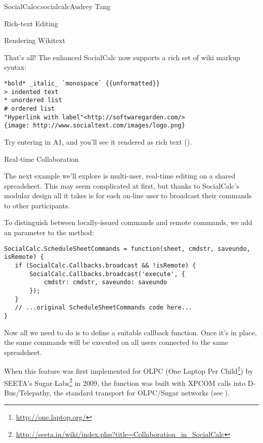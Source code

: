 \begin{aosachapter}{SocialCalc}{s:socialcalc}{Audrey Tang}
\begin{aosasect1}{Rich-text Editing}
\begin{aosasect2}{Rendering Wikitext}

That's all!  The enhanced SocialCalc now supports a rich set of wiki
markup syntax:

\begin{verbatim}
*bold* _italic_ `monospace` {{unformatted}}
> indented text
* unordered list
# ordered list
"Hyperlink with label"<http://softwaregarden.com/>
{image: http://www.socialtext.com/images/logo.png}
\end{verbatim}

\noindent Try entering  in A1, and you'll
see it rendered as rich text ().


\end{aosasect2}

\end{aosasect1}


\begin{aosasect1}{Real-time Collaboration}

The next example we'll explore is multi-user, real-time editing on a
shared spreadsheet.  This may seem complicated at first, but thanks to
SocialCalc's modular design all it takes is for each on-line user to
broadcast their commands to other participants.

To distinguish between locally-issued commands and remote commands, we
add an  parameter to the 
method:

\begin{verbatim}
SocialCalc.ScheduleSheetCommands = function(sheet, cmdstr, saveundo, isRemote) {
   if (SocialCalc.Callbacks.broadcast && !isRemote) {
       SocialCalc.Callbacks.broadcast('execute', {
           cmdstr: cmdstr, saveundo: saveundo
       });
   }
   // ...original ScheduleSheetCommands code here...
}
\end{verbatim}

\noindent Now all we need to do is to define a suitable
 callback function.  Once it's
in place, the same commands will be executed on all users connected
to the same spreadsheet.

When this feature was first implemented for OLPC (One Laptop Per 
Child\footnote{\url{http://one.laptop.org/}}) by SEETA's Sugar 
Labs\footnote{\url{http://seeta.in/wiki/index.php?title=Collaboration_in_SocialCalc}}
in 2009, the  function was built with XPCOM calls into
D-Bus/Telepathy, the standard transport for OLPC/Sugar networks (see
).


\end{aosasect1}
\end{aosachapter}
